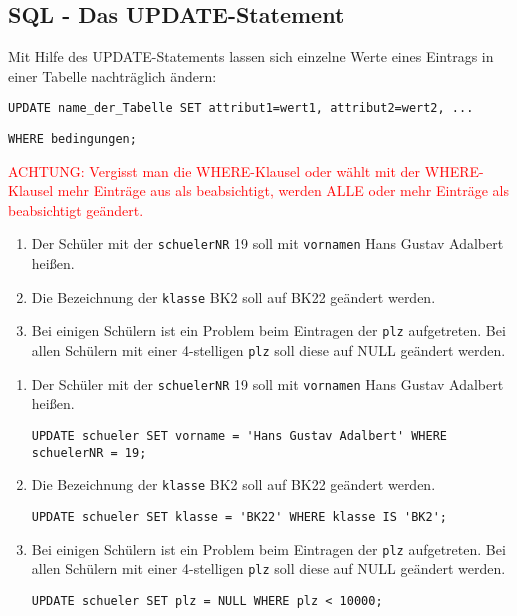 \subsection[UPDATE-Statement]{SQL - Das UPDATE-Statement}\label{update}
Mit Hilfe des UPDATE-Statements lassen sich einzelne Werte eines Eintrags in einer Tabelle nachträglich ändern:
\begin{tcolorbox}[title=UPDATE-Statement]
	\lstinline!UPDATE name_der_Tabelle SET attribut1=wert1, attribut2=wert2, ...!

    \lstinline!WHERE bedingungen;!
\end{tcolorbox}
\textcolor{red}{ACHTUNG: Vergisst man die WHERE-Klausel oder wählt mit der WHERE-Klausel mehr Einträge aus als beabsichtigt, werden ALLE oder mehr Einträge als beabsichtigt geändert.}
\begin{Exercise}[title={Ändere folgende Einträge aus der Datenbank:}, label=Update]
	\begin{enumerate}
		\item Der Schüler mit der \lstinline!schuelerNR! 19 soll mit \lstinline!vornamen! Hans Gustav Adalbert heißen.
		\item Die Bezeichnung der \lstinline!klasse! BK2 soll auf BK22 geändert werden.
		\item Bei einigen Schülern ist ein Problem beim Eintragen der \lstinline!plz! aufgetreten. Bei allen Schülern mit einer 4-stelligen \lstinline!plz! soll diese auf NULL geändert werden.
	\end{enumerate}
\end{Exercise}
\begin{Answer}[ref=Update]
	\begin{enumerate}
		\item Der Schüler mit der \lstinline!schuelerNR! 19 soll mit \lstinline!vornamen! Hans Gustav Adalbert heißen.

		\lstinline!UPDATE schueler SET vorname = 'Hans Gustav Adalbert' WHERE schuelerNR = 19;!
		\item Die Bezeichnung der \lstinline!klasse! BK2 soll auf BK22 geändert werden.

		\lstinline!UPDATE schueler SET klasse = 'BK22' WHERE klasse IS 'BK2';!
		\item Bei einigen Schülern ist ein Problem beim Eintragen der \lstinline!plz! aufgetreten. Bei allen Schülern mit einer 4-stelligen \lstinline!plz! soll diese auf NULL geändert werden.

		\lstinline!UPDATE schueler SET plz = NULL WHERE plz < 10000;!
	\end{enumerate}
\end{Answer}
